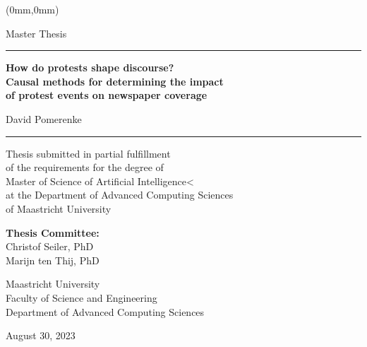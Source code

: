\begin{textblock*}{\paperwidth}(0mm,0mm)
\begin{centering}
\begin{large}

\vspace{4cm}

Master Thesis

\vspace{1cm}

\rule{5cm}{0.4pt}

\vspace{0.5cm}

\textbf{
{\Huge How do protests shape discourse?}\\
{\huge
Causal methods for determining the impact\\
of protest events on newspaper coverage}
}

\vspace{0.5cm}

{\Large David Pomerenke}

\vspace{0.5cm}

\rule{5cm}{0.4pt}

\vspace{3cm}

Thesis submitted in partial fulfillment\\
of the requirements for the degree of\\
Master of Science of Artificial Intelligence<\\
at the Department of Advanced Computing Sciences\\
of Maastricht University

\vspace{1cm}

\textbf{Thesis Committee:}\\
Christof Seiler, PhD\\
Marijn ten Thij, PhD

\vspace{3cm}

Maastricht University\\
Faculty of Science and Engineering\\
Department of Advanced Computing Sciences

\vspace{1cm}

August 30, 2023

\end{large}
\end{centering}
\end{textblock*}
\vspace*{\fill}
\thispagestyle{empty}
\newpage


